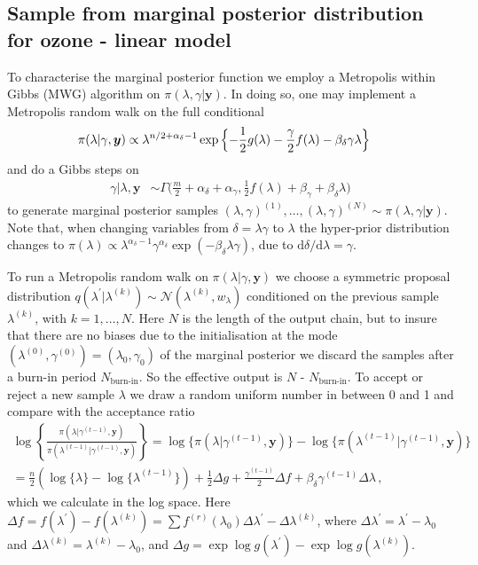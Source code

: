 \subsection{Sample from marginal posterior distribution for ozone - linear model}
\label{subsec:firstMarg}

To characterise the marginal posterior function we employ a Metropolis within Gibbs (MWG) algorithm on $\pi(\lambda, \gamma | \bm{y})$.
In doing so, one may implement a Metropolis random walk on the full conditional
\begin{align}
	\label{eq:lamCondPrior}
	\pi(\lambda | \gamma, \bm{y}) &\propto \lambda^{n/2+\alpha_\delta -1} \exp{\Bigl\{ - \frac{1}{2} g ( \lambda) - \frac{\gamma}{2} f ( \lambda) - \beta_\delta \gamma \lambda \Bigr\}} 
\end{align} 
and do a Gibbs steps on
\begin{align}
	\gamma |  \lambda, \bm{y} &\sim \Gamma \bigg( \frac{m}{2} + \alpha_\delta + \alpha_\gamma, \frac{1}{2} f (\lambda ) + \beta_\gamma + \beta_\delta \lambda \bigg)\label{eq:GibbsStep}
\end{align} 
to generate marginal posterior samples $(\lambda, \gamma)^{(1)}, \dots, (\lambda, \gamma)^{(N)} \sim  \pi(\lambda, \gamma| \bm{y})$.
Note that, when changing variables from $\delta = \lambda \gamma$ to $\lambda$ the hyper-prior distribution changes to $\pi(\lambda) \propto \lambda^{\alpha_\delta-1} \gamma^{\alpha_\delta} \exp{(- \beta_\delta \lambda  \gamma)} $, due to $\text{d}\delta / \text{d} \lambda = \gamma$.

To run a Metropolis random walk on $\pi(\lambda | \gamma, \bm{y}) $ we choose a symmetric proposal distribution $q(\lambda^\prime|\lambda^{(k)}) \sim \mathcal{N}(\lambda^{(k)}, w_\lambda)$ conditioned on the previous sample $\lambda^{(k)}$, with $k = 1 , \dots, N$.
Here $N$ is the length of the output chain, but to insure that there are no biases due to the initialisation at the mode $( \lambda^{(0)} , \gamma^{(0)}  ) = ( \lambda_{0} , \gamma_{0}  )$  of the marginal posterior we discard the samples after a burn-in period $N_{\text{burn-in}}$.
So the effective output is  $N$ - $N_{\text{burn-in}}$.
To accept or reject a new sample $\lambda$ we draw a random uniform number in between 0 and 1 and compare with the acceptance ratio
\begin{align} 
	\log \left\{ \frac{\pi(\lambda | \gamma^{(t-1)}, \bm{y})  }{\pi(\lambda^{(t-1)}| \gamma^{(t-1)}, \bm{y})}  \right\} 
	= \log  \{\pi(\lambda | \gamma^{(t-1)}, \bm{y} ) \}  -\log  \{ \pi(\lambda^{(t-1)}| \gamma^{(t-1)}, \bm{y}) \} \\
	= \frac{n}{2} (\log\{\lambda\} - \log\{\lambda^{(t-1)}\} ) + \frac{1}{2} \Delta g + \frac{\gamma^{(t-1)}}{2} \Delta f  + \beta_\delta \gamma^{(t-1)} \Delta \lambda  \, ,
\end{align}
which we calculate in the log space.
Here $\Delta f = f(\lambda^\prime) - f(\lambda^{(k)}) = \sum f^{(r)} (\lambda_0)\Delta \lambda^\prime - \Delta \lambda^{(k)} $, where $\Delta \lambda^\prime = \lambda^\prime - \lambda_0 $ and $\Delta \lambda^{(k)} =  \lambda^{(k)} - \lambda_0$, and $\Delta g = \exp{\log{g(\lambda^{\prime})}} - \exp{\log{g(\lambda^{(k)})}}$.

